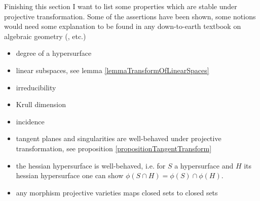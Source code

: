 Finishing this section I want to list some properties which are stable under projective transformation.
Some of the assertions have been shown, some notions would need some explanation to be found in any down-to-earth textbook on algebraic geometry (\cite{shafarevich1994basic, harris1992algebraic, brieskorn2012plane}, etc.)
\begin{itemize}
\item degree of a hypersurface
\item linear subspaces, see lemma \ref{lemmaTransformOfLinearSpaces}
\item irreducibility
\item Krull dimension
\item incidence
\item tangent planes and singularities are well-behaved under projective transformation, see proposition \ref{propositionTangentTransform}
\item the hessian hypersurface is well-behaved, i.e. for $S$ a hypersurface and $H$ its hessian hypersurface one can show $\phi(S \cap H) = \phi(S) \cap \phi(H)$.
\item any morphism projective varieties maps closed sets to closed sets
\end{itemize}

